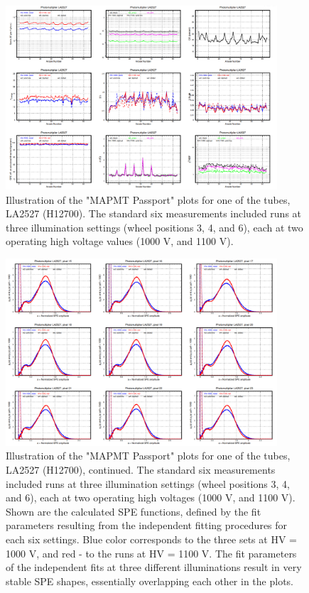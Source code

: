 \begin{figure}[!ht]
	\centering
	\includegraphics[width=0.9\textwidth,height=.55\textwidth]{figures/pavel_temp/LA2527_passport_temp.png}
	\caption{Illustration of the "MAPMT Passport" plots for one of the tubes, LA2527 (H12700). The standard six measurements included runs at three illumination settings (wheel positions 3, 4, and 6), each at two operating high voltage values (1000 V, and 1100 V).}
	\label{fig:LA2527_passport}
\end{figure}
\begin{figure}[!ht]
	\centering
	\includegraphics[width=0.9\textwidth,height=.55\textwidth]{figures/pavel_temp/LA2527_spectra_temp.png}
	\caption{Illustration of the "MAPMT Passport" plots for one of the tubes, LA2527 (H12700), continued. The standard six measurements included runs at three illumination settings (wheel positions 3, 4, and 6), each at two operating high voltages (1000 V, and 1100 V). Shown are the calculated SPE functions, defined by the fit parameters resulting from the independent fitting procedures for each six settings. Blue color corresponds to the three sets at HV = 1000 V, and red - to the runs at HV = 1100 V. The fit parameters of the independent fits at three different illuminations result in very stable SPE shapes, essentially overlapping each other in the plots.}
	\label{fig:LA2527_passport_spectra}
\end{figure}

